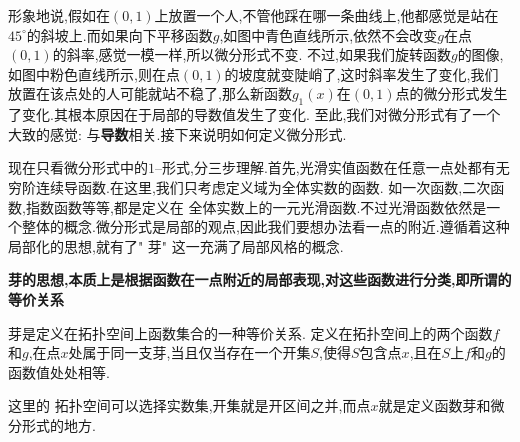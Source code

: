 形象地说,假如在$(0,1)$上放置一个人,不管他踩在哪一条曲线上,他都感觉是站在$45^\circ$的斜坡上.而如果向下平移函数$g$,如图中青色直线所示,依然不会改变$g$在点$(0,1)$的斜率,感觉一模一样,所以微分形式不变.
不过,如果我们旋转函数$g$的图像,如图中粉色直线所示,则在点$(0,1)$的坡度就变陡峭了,这时斜率发生了变化,我们放置在该点处的人可能就站不稳了,那么新函数$g_1(x)$在$(0,1)$点的微分形式发生了变化.其根本原因在于局部的导数值发生了变化.
至此,我们对微分形式有了一个大致的感觉: 与\textbf{导数}相关.接下来说明如何定义微分形式.
\begin{center}
\end{center}
现在只看微分形式中的$1$--形式,分三步理解.首先,光滑实值函数在任意一点处都有无穷阶连续导函数.在这里,我们只考虑定义域为全体实数的函数. 如一次函数,二次函数,指数函数等等,都是定义在
全体实数上的一元光滑函数.不过光滑函数依然是一个整体的概念.微分形式是局部的观点,因此我们要想办法看一点的附近.遵循着这种局部化的思想,就有了" 芽"
这一充满了局部风格的概念.

\textbf{芽的思想,本质上是根据函数在一点附近的局部表现,对这些函数进行分类,即所谓的等价关系}
\begin{definition}[芽][def:芽]
    芽是定义在拓扑空间上函数集合的一种等价关系.
    定义在拓扑空间上的两个函数$f$和$g$,在点$x$处属于同一支芽,当且仅当存在一个开集$S$,使得$S$包含点$x$,且在$S$上$f$和$g$的函数值处处相等.
\end{definition}
这里的 拓扑空间可以选择实数集,开集就是开区间之并,而点$x$就是定义函数芽和微分形式的地方.

